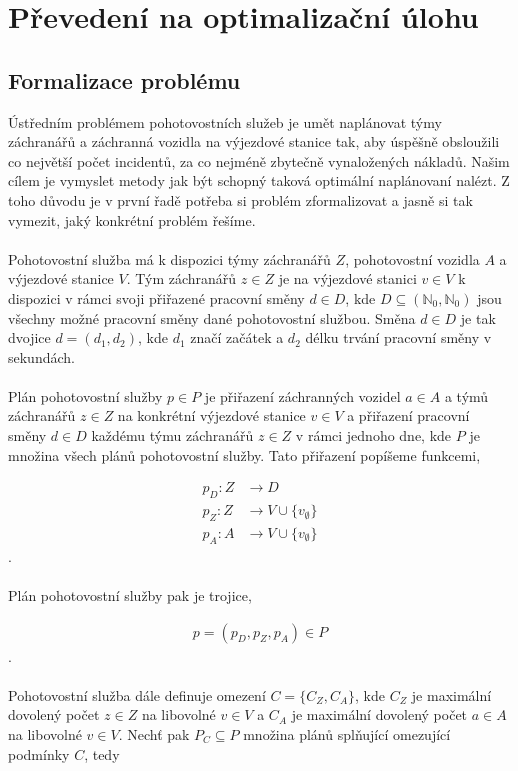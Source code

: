 \chapter{Převedení na optimalizační úlohu}

\section{Formalizace problému}

Ústředním problémem pohotovostních služeb je umět naplánovat týmy záchranářů a záchranná vozidla na výjezdové stanice tak, aby úspěšně obsloužili co největší počet incidentů,
za co nejméně zbytečně vynaložených nákladů.
Našim cílem je vymyslet metody jak být schopný taková optimální naplánovaní nalézt.
Z toho důvodu je v první řadě potřeba si problém zformalizovat a jasně si tak vymezit, jaký konkrétní problém řešíme.
\\
\\
Pohotovostní služba má k dispozici týmy záchranářů $Z$, pohotovostní vozidla $A$ a výjezdové stanice $V$.
Tým záchranářů $z \in Z$ je na výjezdové stanici $v \in V$ k dispozici v rámci svoji přiřazené pracovní směny $d \in D$,
kde $D \subseteq (\mathbb{N}_0, \mathbb{N}_0)$ jsou všechny možné pracovní směny dané pohotovostní službou.
Směna $d \in D$ je tak dvojice $d = (d_1, d_2)$, kde $d_1$ značí začátek a $d_2$ délku trvání pracovní směny v sekundách.
\\
\\
Plán pohotovostní služby $p \in P$ je přiřazení záchranných vozidel $a \in A$ a týmů záchranářů $z \in Z$ na konkrétní výjezdové stanice $v \in V$
a přiřazení pracovní směny $d \in D$ každému týmu záchranářů $z \in Z$ v rámci jednoho dne, kde $P$ je množina všech plánů pohotovostní služby.
Tato přiřazení popíšeme funkcemi, 

\begin{align}
  p_D \colon Z &\rightarrow D \\
  p_Z \colon Z &\rightarrow V \cup \{ v_{\emptyset} \} \\
  p_A \colon A &\rightarrow V \cup \{ v_{\emptyset} \}
\end{align}
.
\\
\\
Plán pohotovostní služby pak je trojice,

\begin{align}
  p = (p_D, p_Z, p_A) \in P
\end{align}
.
\\
\\
Pohotovostní služba dále definuje omezení $C = \{ C_Z, C_A \}$, kde $C_Z$ je maximální dovolený počet $z \in Z$ na libovolné $v \in V$
a $C_A$ je maximální dovolený počet $a \in A$ na libovolné $v \in V$.
Nechť pak $P_C \subseteq P$ množina plánů splňující omezující podmínky $C$, tedy

